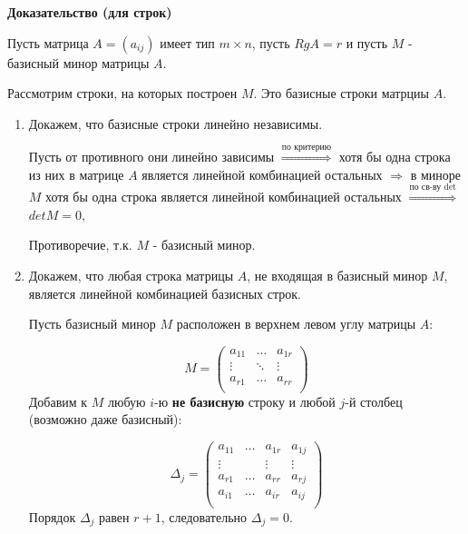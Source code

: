 \vspace*{15pt}

{\bf{Доказательство (для строк)}}

\vspace*{15pt}

Пусть матрица $A = (a_{ij})$ имеет тип $m \times n$, пусть $RgA = r$ и пусть $M$ - базисный минор матрицы $A$.

Рассмотрим строки, на которых построен $M$. Это базисные строки матрциы $A$.

\begin{enumerate}
    \item Докажем, что базисные строки линейно независимы.
    
    Пусть от противного они линейно зависимы $\overset{\text{по критерию}}{\Rightarrow}$ хотя бы одна строка из них в матрице $A$ является линейной комбинацией остальных $\Rightarrow$ в миноре $M$ хотя бы одна строка является линейной комбинацией остальных $\overset{\text{по св-ву det}}{\Rightarrow}$ $detM = 0$,
    
    Противоречие, т.к. $M$ - базисный минор.

    \item Докажем, что любая строка матрицы $A$, не входящая в базисный минор $M$, является линейной комбинацией базисных строк.

    Пусть базисный минор $M$ расположен в верхнем левом углу матрицы $A$:
    
    $$
    M = 
    \begin{pmatrix}
        a_{11}&\ldots&a_{1r}\\
        \vdots&\ddots&\vdots\\
        a_{r1}&\ldots&a_{rr}\\
    \end{pmatrix}
    $$
    Добавим к $M$ любую $i$-ю {\bf {не базисную}} строку и любой $j$-й столбец (возможно даже базисный):
    
    $$
    \Delta_j = 
    \begin{pmatrix}
        a_{11}&\ldots&a_{1r}&a_{1j}\\
        \vdots&&\vdots&\vdots\\
        a_{r1}&\ldots&a_{rr}&a_{rj}\\
        a_{i1}&\ldots&a_{ir}&a_{ij}\\
    \end{pmatrix}
    $$
Порядок $\Delta_j$ равен $r + 1$, следовательно $\Delta_j = 0.$


\end{enumerate}
